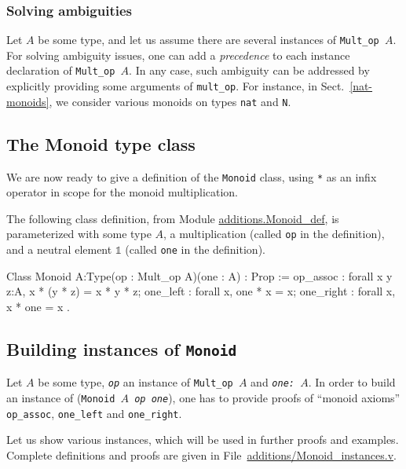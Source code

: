 \subsubsection{Solving ambiguities}
Let $A$ be some type, and let us assume there are several instances of
\texttt{Mult\_op $A$}. For solving ambiguity issues, one can
add a \emph{precedence} to each instance declaration of  
\texttt{Mult\_op $A$}. In any case, such ambiguity  can be addressed
by explicitly providing  some arguments of \texttt{mult\_op}.
For instance, in Sect.~\vref{nat-monoids}, we consider various monoids on types
\texttt{nat} and \texttt{N}. 


\subsection{The Monoid type class}
We are now ready to  give a definition of the \texttt{Monoid} class, using
\texttt{*} as an infix operator in scope  for the monoid  multiplication.

The following class definition, from Module \href{../theories/html/additions.Monoid_def.html}{additions.Monoid\_def},
is parameterized with some type $A$,
a multiplication (called \texttt{op} in the definition), and a neutral element
$\mathds{1}$ (called \texttt{one} in the definition).

\label{sect:monoid-def}


\begin{Coqsrc}
Class Monoid {A:Type}(op : Mult_op A)(one : A) : Prop :=
{
    op_assoc : forall x y z:A, x * (y * z) = x * y * z;
    one_left : forall x, one * x = x;
    one_right : forall x, x * one = x
}.
\end{Coqsrc}


\subsection{Building instances of \texttt{Monoid}}
Let \texttt{$A$} be some type, \texttt{{\it op}} an instance of 
\texttt{Mult\_op $A$} and \texttt{\it one: $A$}.
In order to build an instance of (\texttt{Monoid $A$ {\it op} {\it one}}),
one has to provide proofs of ``monoid axioms'' \texttt{ op\_assoc},
\texttt{one\_left} and \texttt{one\_right}.

Let us show various instances, which will be used in further proofs and examples.
Complete definitions and proofs are given in 
File~\href{../theories/html/additions.Monoid_instances.html}{additions/Monoid\_instances.v}.


